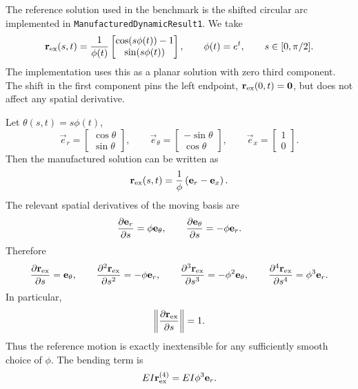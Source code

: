 The reference solution used in the benchmark is the shifted circular arc
implemented in \texttt{ManufacturedDynamicResult1}. We take
\begin{equation*}
    \vec r_{\rm ex}(s,t)
    =
    \frac1{\phi(t)}
    \begin{bmatrix}
        \cos(s\phi(t)) - 1 \\
        \sin(s\phi(t))
    \end{bmatrix},
    \qquad
    \phi(t)=e^t,
    \qquad
    s\in[0,\pi/2].
\end{equation*}
The implementation uses this as a planar solution with zero third component.
The shift in the first component pins the left endpoint,
\(\vec r_{\rm ex}(0,t)=\vec 0\), but does not affect any spatial derivative.

Let \(\theta(s,t) = s\phi(t)\),
\begin{equation*}
    \vec e_r = \begin{bmatrix}\cos{\theta} \\ \sin{\theta} \end{bmatrix}, \qquad
    \vec e_\theta = \begin{bmatrix}-\sin{\theta} \\ \cos{\theta}\end{bmatrix}, \qquad
    \vec e_x = \begin{bmatrix}1 \\ 0\end{bmatrix}.
\end{equation*}
Then the manufactured solution can be written as
\begin{equation*}
    \vec r_{\rm ex}(s,t) = \frac1\phi \left(\vec e_r - \vec e_x\right).
\end{equation*}
The relevant spatial derivatives of the moving basis are
\begin{equation*}
    \pdv{\vec e_r}{s} = \phi \vec e_\theta, \qquad
    \pdv{\vec e_\theta}{s} = -\phi \vec e_r.
\end{equation*}
Therefore
\begin{equation*}
    \pdv{\vec r_{\rm ex}}{s} = \vec e_\theta,
    \qquad
    \pdv[2]{\vec r_{\rm ex}}{s} = -\phi\vec e_r,
    \qquad
    \pdv[3]{\vec r_{\rm ex}}{s} = -\phi^2\vec e_\theta,
    \qquad
    \pdv[4]{\vec r_{\rm ex}}{s} = \phi^3\vec e_r.
\end{equation*}
In particular,
\begin{equation*}
    \norm{\pdv{\vec r_{\rm ex}}{s}} = 1.
\end{equation*}
Thus the reference motion is exactly inextensible for any sufficiently smooth
choice of \(\phi\). The bending term is
\begin{equation*}
    EI \vec r_{\rm ex}^{(4)} = EI \phi^3 \vec e_r.
\end{equation*}

